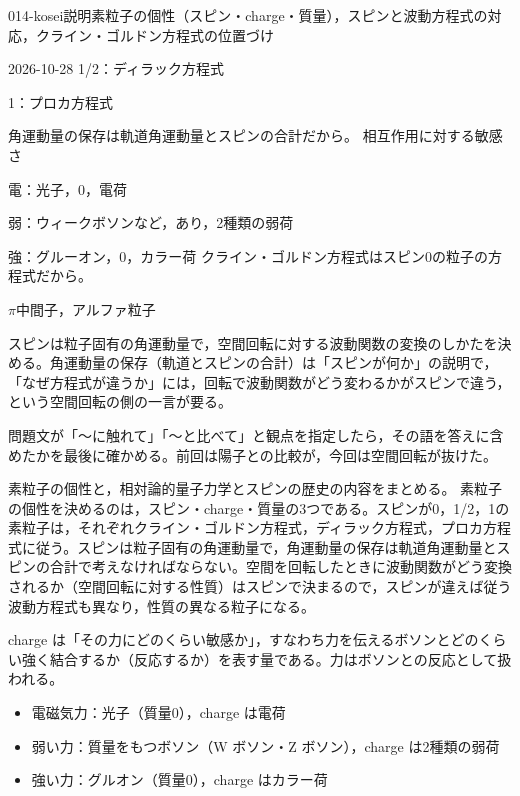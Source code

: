 \documentclass[uplatex,dvipdfmx,a4paper,11pt]{jsarticle}
\begin{document}
\begin{mondai}{014-kosei}{説明}{素粒子の個性（スピン・charge・質量），スピンと波動方程式の対応，クライン・ゴルドン方程式の位置づけ}
\begin{kotaeutsushi}{2026-10-28}
1/2：ディラック方程式

1：プロカ方程式

角運動量の保存は軌道角運動量とスピンの合計だから。
相互作用に対する敏感さ

電：光子，0，電荷

弱：ウィークボソンなど，あり，2種類の弱荷

強：グルーオン，0，カラー荷
クライン・ゴルドン方程式はスピン0の粒子の方程式だから。

$\pi$中間子，アルファ粒子
\end{kotaeutsushi}
\begin{kizuki}
\item スピンは粒子固有の角運動量で，空間回転に対する波動関数の変換のしかたを決める。角運動量の保存（軌道とスピンの合計）は「スピンが何か」の説明で，「なぜ方程式が違うか」には，回転で波動関数がどう変わるかがスピンで違う，という空間回転の側の一言が要る。
\item {} 問題文が「〜に触れて」「〜と比べて」と観点を指定したら，その語を答えに含めたかを最後に確かめる。前回は陽子との比較が，今回は空間回転が抜けた。
\end{kizuki}
\begin{tadashii}
\houshin 素粒子の個性と，相対論的量子力学とスピンの歴史の内容をまとめる。
\keisan {} 素粒子の個性を決めるのは，スピン・charge・質量の3つである。スピンが0，1/2，1の素粒子は，それぞれクライン・ゴルドン方程式，ディラック方程式，プロカ方程式に従う。スピンは粒子固有の角運動量で，角運動量の保存は軌道角運動量とスピンの合計で考えなければならない。空間を回転したときに波動関数がどう変換されるか（空間回転に対する性質）はスピンで決まるので，スピンが違えば従う波動方程式も異なり，性質の異なる粒子になる。 %

 charge は「その力にどのくらい敏感か」，すなわち力を伝えるボソンとどのくらい強く結合するか（反応するか）を表す量である。力はボソンとの反応として扱われる。 %
\begin{itemize}
  \item 電磁気力：光子（質量0），charge は電荷
  \item 弱い力：質量をもつボソン（\hanigai W ボソン・Z ボソン），charge は2種類の弱荷
  \item 強い力：グルオン（質量0），charge はカラー荷
\end{itemize}


\end{tadashii}
\end{mondai}
\end{document}
